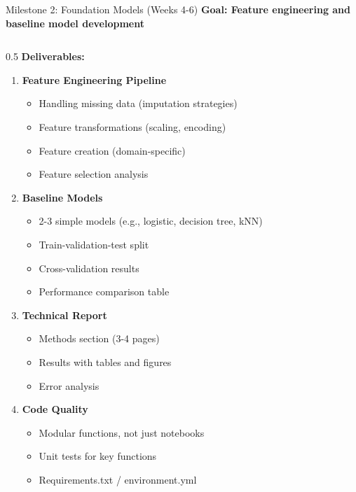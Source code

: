 
\begin{frame}{Milestone 2: Foundation Models (Weeks 4-6)}
\textbf{Goal: Feature engineering and baseline model development}

\begin{columns}
\begin{column}{0.5\textwidth}
\textbf{Deliverables:}

\begin{enumerate}
\item \textbf{Feature Engineering Pipeline}
   \begin{itemize}
   \item Handling missing data (imputation strategies)
   \item Feature transformations (scaling, encoding)
   \item Feature creation (domain-specific)
   \item Feature selection analysis
   \end{itemize}

\item \textbf{Baseline Models}
   \begin{itemize}
   \item 2-3 simple models (e.g., logistic, decision tree, kNN)
   \item Train-validation-test split
   \item Cross-validation results
   \item Performance comparison table
   \end{itemize}

\item \textbf{Technical Report}
   \begin{itemize}
   \item Methods section (3-4 pages)
   \item Results with tables and figures
   \item Error analysis
   \end{itemize}

\item \textbf{Code Quality}
   \begin{itemize}
   \item Modular functions, not just notebooks
   \item Unit tests for key functions
   \item Requirements.txt / environment.yml
   \end{itemize}
\end{enumerate}
\end{column}


\end{columns}
\end{frame}
